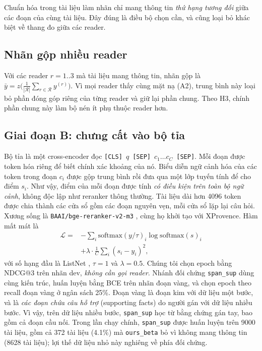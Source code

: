 \documentclass[11pt]{article}
\newcommand{\arm}[1]{\texttt{#1}}
\begin{document}
Chuẩn hóa trong tài liệu làm nhãn chỉ mang thông tin \emph{thứ hạng tương đối}
giữa các đoạn của cùng tài liệu. Đây đúng là điều bộ chọn cần, và cũng loại bỏ
khác biệt về thang đo giữa các reader.

\subsection{Nhãn gộp nhiều reader}
\label{sec:method-ens}

Với các reader $r=1..3$ mà tài liệu mang thông tin, nhãn gộp là
$\bar y = z\big(\tfrac{1}{|\mathcal{R}|}\sum_{r\in\mathcal{R}} y^{(r)}\big)$. Vì
mọi reader thấy cùng mặt nạ (A2), trung bình này loại bỏ phần đóng góp riêng của
từng reader và giữ lại phần chung. Theo H3, chính phần chung này làm bộ nén ít phụ
thuộc reader hơn.

\subsection{Giai đoạn B: chưng cất vào bộ tỉa}
\label{sec:method-pruner}

Bộ tỉa là một cross-encoder đọc
\texttt{[CLS]}~$q$~\texttt{[SEP]}~$c_1\dots c_C$~\texttt{[SEP]}. Mỗi đoạn được
token hóa riêng để biết chính xác khoảng của nó. Biểu diễn ngữ cảnh hóa của các token
trong đoạn $c_i$ được gộp trung bình rồi đưa qua một lớp tuyến tính để cho điểm
$s_i$. Như vậy, điểm của mỗi đoạn được tính \emph{có điều kiện trên toàn bộ ngữ
cảnh}, không độc lập như reranker thông thường. Tài liệu dài hơn 4096 token được chia thành các cửa sổ gồm
các đoạn nguyên vẹn, mỗi cửa sổ lặp lại câu hỏi. Xương sống là
\texttt{BAAI/bge-reranker-v2-m3} \citep{chen2024bgem3}, cùng họ khởi tạo với
XProvence. Hàm mất mát là
\begin{equation}
  \begin{split}
  \mathcal{L} = &-\sum_{i}\mathrm{softmax}(y/\tau)_i\log\mathrm{softmax}(s)_i\\
  &+ \lambda\cdot\tfrac{1}{C}\sum_i (s_i-y_i)^2,
  \end{split}
  \label{eq:loss}
\end{equation}
với số hạng đầu là ListNet \citep{cao2007listnet}, $\tau=1$ và $\lambda=0.5$. Chúng
tôi chọn epoch bằng NDCG@3 trên nhãn dev, \emph{không cần gọi reader}. Nhánh đối
chứng \arm{span\_sup} dùng cùng kiến trúc, huấn luyện bằng BCE trên nhãn đoạn vàng,
và chọn epoch theo recall đoạn vàng ở ngân sách 25\%. Đoạn vàng là đoạn kim với dữ liệu một bước, và
là \emph{các đoạn chứa câu hỗ trợ} (supporting facts) do người gán với dữ liệu nhiều bước. Vì vậy, trên
dữ liệu nhiều bước, \arm{span\_sup} học từ bằng chứng gán tay, bao gồm cả đoạn cầu nối.
Trong lần chạy chính, \arm{span\_sup} được huấn luyện trên 9000 tài liệu, gồm cả 372 tài liệu (4.1\%) mà
\arm{ours\_beta} bỏ vì không mang thông tin (8628 tài liệu); lợi thế dữ liệu nhỏ này nghiêng về phía đối chứng.
\end{document}

